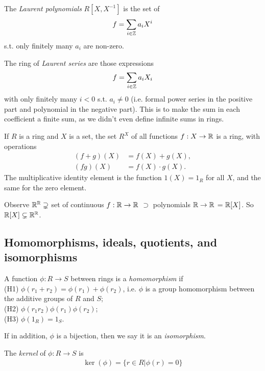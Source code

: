 \documentclass[a4paper]{article}
\begin{document}
\begin{eg}
The \emph{Laurent polynomials} $R[X,X^{-1}]$ is the set of 
\begin{equation*}
\begin{aligned}
f=\sum_{i \in \mathbb{Z}} a_i X^i
\end{aligned}
\end{equation*}
s.t. only finitely many $a_i$ are non-zero.
\end{eg}

\begin{eg}
The ring of \emph{Laurent series} are those expressions
\begin{equation*}
\begin{aligned}
f = \sum_{i\in \mathbb{Z}} a_i X_i
\end{aligned}
\end{equation*}
with only finitely many $i<0$ s.t. $a_i \neq 0$ (i.e. formal power series in the positive part and polynomial in the negative part). This is to make the sum in each coefficient a finite sum, as we didn't even define infinite sums in rings.
\end{eg}

\begin{eg}
If $R$ is a ring and $X$ is a set, the set $R^X$ of all functions $f: X \to \mathbb{R}$ is a ring, with operations
\begin{equation*}
\begin{aligned}
(f+g) (X) &= f(X) + g(X),\\
(fg) (X) &= f(X) \cdot g(X).
\end{aligned}
\end{equation*}
The multiplicative identity element is the function $1(X) = 1_R$ for all $X$, and the same for the zero element.

Observe $\mathbb{R}^{\mathbb{R}} \supsetneq$ set of continuous $f:\mathbb{R} \to \mathbb{R}$ $\supset$ polynomials $\mathbb{R} \to \mathbb{R}$ = $\mathbb{R}[X]$. So $\mathbb{R}[X] \subsetneq \mathbb{R}^{\mathbb{R}}$.
\end{eg}

\subsection{Homomorphisms, ideals, quotients, and isomorphisms}
\begin{defi}
A function $\phi: R \to S$ between rings is a \emph{homomorphism} if\\
(H1) $\phi(r_1+r_2) = \phi(r_1)+\phi(r_2)$, i.e. $\phi$ is a group homomorphism between the additive groups of $R$ and $S$;\\
(H2) $\phi(r_1r_2) \phi(r_1) \phi(r_2)$;\\
(H3) $\phi(1_R) = 1_S$.

If in addition, $\phi$ is a bijection, then we say it is an \emph{isomorphism}.

The \emph{kernel} of $\phi:R \to S$ is
\begin{equation*}
\begin{aligned}
\ker(\phi) = \{r \in R | \phi(r) = 0\}
\end{aligned}
\end{equation*}
\end{defi}
\end{document}
